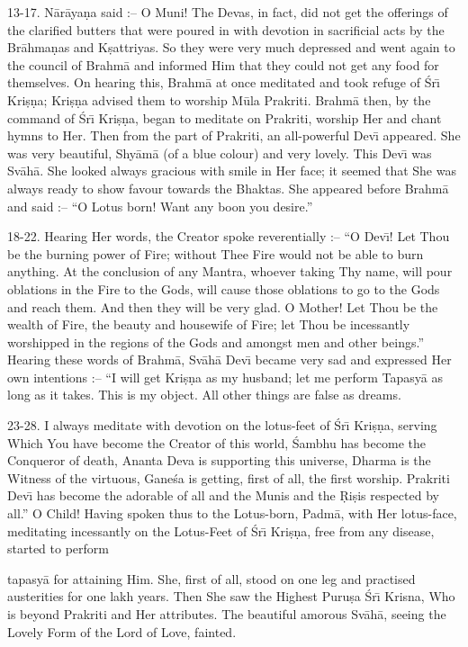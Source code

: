 13-17. N\=ar\=aya\d{n}a said :-- O Muni! The Devas, in fact, did not get the offerings of the clarified butters that were poured in with devotion in sacrificial acts by the Br\=ahma\d{n}as and K\d{s}attriyas. So they were very much depressed and went again to the council of Brahm\=a and informed Him that they could not get any food for themselves. On hearing this, Brahm\=a at once meditated and took refuge of \'Sr\={\i} Kri\d{s}\d{n}a; Kri\d{s}\d{n}a advised them to worship M\=ula Prakriti. Brahm\=a then, by the command of \'Sr\={\i} Kri\d{s}\d{n}a, began to meditate on Prakriti, worship Her and chant hymns to Her. Then from the part of Prakriti, an all-powerful Dev\={\i} appeared. She was very beautiful, Shy\=am\=a (of a blue colour) and very lovely. This Dev\={\i} was Sv\=ah\=a. She looked always gracious with smile in Her face; it seemed that She was always ready to show favour towards the Bhaktas. She appeared before Brahm\=a and said :-- ``O Lotus born! Want any boon you desire.''

18-22. Hearing Her words, the Creator spoke reverentially :-- ``O Dev\={\i}! Let Thou be the burning power of Fire; without Thee Fire would not be able to burn anything. At the conclusion of any Mantra, whoever taking Thy name, will pour oblations in the Fire to the Gods, will cause those oblations to go to the Gods and reach them. And then they will be very glad. O Mother! Let Thou be the wealth of Fire, the beauty and housewife of Fire; let Thou be incessantly worshipped in the regions of the Gods and amongst men and other beings.'' Hearing these words of Brahm\=a, Sv\=ah\=a Dev\={\i} became very sad and expressed Her own intentions :-- ``I will get Kri\d{s}\d{n}a as my husband; let me perform Tapasy\=a as long as it takes. This is my object. All other things are false as dreams.

23-28. I always meditate with devotion on the lotus-feet of \'Sr\={\i} Kri\d{s}\d{n}a, serving Which You have become the Creator of this world, \'Sambhu has become the Conqueror of death, Ananta Deva is supporting this universe, Dharma is the Witness of the virtuous, Gane\'sa is getting, first of all, the first worship. Prakriti Dev\={\i} has become the adorable of all and the Munis and the \d{R}i\d{s}is respected by all.'' O Child! Having spoken thus to the Lotus-born, Padm\=a, with Her lotus-face, meditating incessantly on the Lotus-Feet of \'Sr\={\i} Kri\d{s}\d{n}a, free from any disease, started to perform

tapasy\=a for attaining Him. She, first of all, stood on one leg and practised austerities for one lakh years. Then She saw the Highest Puru\d{s}a \'Sr\={\i} Krisna, Who is beyond Prakriti and Her attributes. The beautiful amorous Sv\=ah\=a, seeing the Lovely Form of the Lord of Love, fainted.

